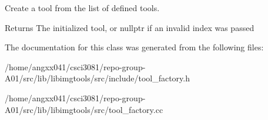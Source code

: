 Create a tool from the list of defined tools. 

\begin{DoxyReturn}{Returns}
The initialized tool, or nullptr if an invalid index was passed 
\end{DoxyReturn}


The documentation for this class was generated from the following files\+:\begin{DoxyCompactItemize}
\item 
/home/angxx041/csci3081/repo-\/group-\/\+A01/src/lib/libimgtools/src/include/tool\+\_\+factory.\+h\item 
/home/angxx041/csci3081/repo-\/group-\/\+A01/src/lib/libimgtools/src/tool\+\_\+factory.\+cc\end{DoxyCompactItemize}
